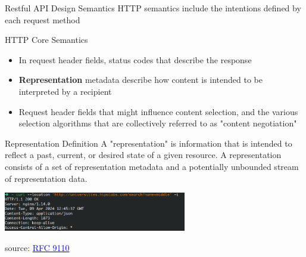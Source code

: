 \documentclass{beamer}
\begin{document}
\begin{frame}[t]{Restful API Design Semantics}
	\scriptsize
	HTTP semantics include the intentions defined by each request method
	
	\begin{block}{HTTP Core Semantics}
		\begin{itemize}
			\item In request header fields, status codes that describe the response
			\item \textbf{Representation} metadata describe how content is intended to be interpreted by a recipient
			\item Request header fields that might influence content selection, and the various selection algorithms that are collectively referred to as "content negotiation"
		\end{itemize}				
	\end{block}	
	
	\begin{block}{Representation Definition}
		A "representation" is information that is intended to reflect a past, current, or desired state of a given resource. A representation consists of a set of representation metadata and a potentially unbounded stream of representation data.
	\end{block}		
		
	\begin{center}
   		\includegraphics[width=0.6\textwidth, height=0.2\textheight]{img/header-metadata.png}
	\end{center}
	
	  \tiny source: \href{https://www.rfc-editor.org/rfc/rfc9110.html} {\textcolor{blue}{RFC 9110}} 

\end{frame}
\end{document}

